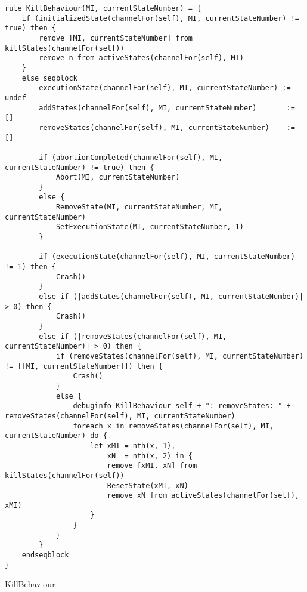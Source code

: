 \begin{listing}[H]
\begin{verbatim}
rule KillBehaviour(MI, currentStateNumber) = {
    if (initializedState(channelFor(self), MI, currentStateNumber) != true) then {
        remove [MI, currentStateNumber] from killStates(channelFor(self))
        remove n from activeStates(channelFor(self), MI)
    }
    else seqblock
        executionState(channelFor(self), MI, currentStateNumber) := undef
        addStates(channelFor(self), MI, currentStateNumber)       := []
        removeStates(channelFor(self), MI, currentStateNumber)    := []

        if (abortionCompleted(channelFor(self), MI, currentStateNumber) != true) then {
            Abort(MI, currentStateNumber)
        }
        else {
            RemoveState(MI, currentStateNumber, MI, currentStateNumber)
            SetExecutionState(MI, currentStateNumber, 1)
        }

        if (executionState(channelFor(self), MI, currentStateNumber) != 1) then {
            Crash()
        }
        else if (|addStates(channelFor(self), MI, currentStateNumber)| > 0) then {
            Crash()
        }
        else if (|removeStates(channelFor(self), MI, currentStateNumber)| > 0) then {
            if (removeStates(channelFor(self), MI, currentStateNumber) != [[MI, currentStateNumber]]) then {
                Crash()
            }
            else {
                debuginfo KillBehaviour self + ": removeStates: " + removeStates(channelFor(self), MI, currentStateNumber)
                foreach x in removeStates(channelFor(self), MI, currentStateNumber) do {
                    let xMI = nth(x, 1),
                        xN  = nth(x, 2) in {
                        remove [xMI, xN] from killStates(channelFor(self))
                        ResetState(xMI, xN)
                        remove xN from activeStates(channelFor(self), xMI)
                    }
                }
            }
        }
    endseqblock
}
\end{verbatim}
\caption{KillBehaviour}
\label{lst:asm:KillBehaviour}
\end{listing}




